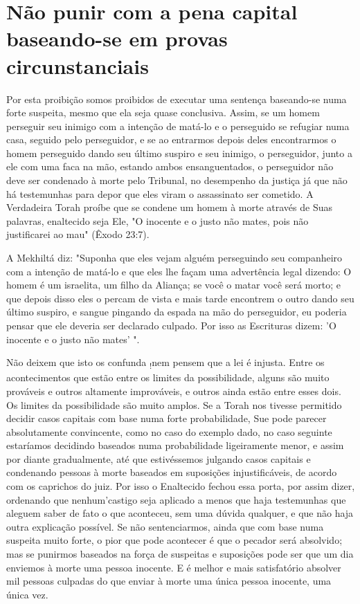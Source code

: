 \section{Não punir com a pena capital baseando-se em provas circunstanciais}

Por esta proibição somos proibidos de executar uma sentença baseando-se
numa forte suspeita, mesmo que ela seja quase conclusiva. Assim, se um
homem perseguir seu inimigo com a intenção de matá-lo e o perseguido se
refugiar numa casa, seguido pelo perseguidor, e se ao entrarmos depois
de­les encontrarmos o homem perseguido dando seu último suspiro e seu
inimi­go, o perseguidor, junto a ele com uma faca na mão, estando ambos
ensanguen­tados, o perseguidor não deve ser condenado à morte pelo
Tribunal, no de­sempenho da justiça já que não há testemunhas para depor
que eles viram o assassinato ser cometido. A Verdadeira Torah proíbe que
se condene um ho­mem à morte através de Suas palavras, enaltecido seja
Ele, "O inocente e o jus­to não mates, pois não justificarei ao mau"
(Êxodo 23:7).

A Mekhiltá diz: "Suponha que eles vejam alguém perseguindo seu
companheiro com a intenção de matá-lo e que eles lhe façam uma
advertência legal dizendo: O homem é um israelita, um filho da Aliança;
se você o matar você será morto; e que depois disso eles o percam de
vista e mais tarde encon­trem o outro dando seu último suspiro, e sangue
pingando da espada na mão do perseguidor, eu poderia pensar que ele
deveria ser declarado culpado. Por isso as Escrituras dizem: 'O inocente
e o justo não mates' ".

Não deixem que isto os confunda \textsubscript{!}nem pensem que a lei é
injusta. Entre os acontecimentos que estão entre os limites da
possibilidade, alguns são muito prováveis e outros altamente
improváveis, e outros ainda estão entre es­ses dois. Os limites da
possibilidade são muito amplos. Se a Torah nos tivesse permitido decidir
casos capitais com base numa forte probabilidade, Sue pode parecer
absolutamente convincente, como no caso do exemplo dado, no caso
seguinte estaríamos decidindo baseados numa probabilidade ligeiramente
me­nor, e assim por diante gradualmente, até que estivéssemos julgando
casos ca­pitais e condenando pessoas à morte baseados em suposições
injustificáveis, de acordo com os caprichos do juiz. Por isso o
Enaltecido fechou essa porta, por assim dizer, ordenando que
nenhum'castigo seja aplicado a menos que ha­ja testemunhas que aleguem
saber de fato o que aconteceu, sem uma dúvida qualquer, e que não haja
outra explicação possível. Se não sentenciarmos, ain­da que com base
numa suspeita muito forte, o pior que pode acontecer é que o pecador
será absolvido; mas se punirmos baseados na força de suspeitas e
suposições pode ser que um dia enviemos à morte uma pessoa inocente. E é
melhor e mais satisfatório absolver mil pessoas culpadas do que enviar à
morte uma única pessoa inocente, uma única vez.

